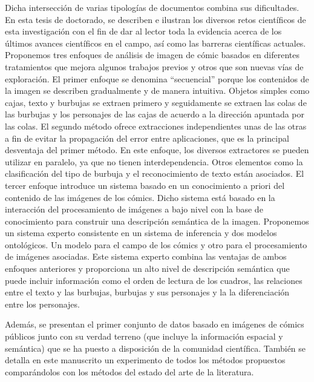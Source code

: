 Dicha intersección de varias tipologías de documentos combina sus dificultades.
En esta tesis de doctorado, se describen e ilustran los diversos retos científicos de esta investigación con el fin de dar al lector toda la evidencia acerca de los últimos avances científicos en el campo, así como las barreras científicas actuales.
Proponemos tres enfoques de análisis de imagen de cómic basados en diferentes tratamientos que mejora algunos trabajos previos y otros que son nuevas vías de exploración.
El primer enfoque se denomina ``secuencial'' porque los contenidos de la imagen se describen gradualmente y de manera intuitiva.
Objetos simples como cajas, texto y burbujas se extraen primero y seguidamente se extraen las colas de las burbujas y los personajes de las cajas de acuerdo a la dirección apuntada por las colas.
El segundo método ofrece extracciones independientes unas de las otras a fin de evitar la propagación del error entre aplicaciones, que es la principal desventaja del primer método.
En este enfoque, los diversos extractores se pueden utilizar en paralelo, ya que no tienen interdependencia.
Otros elementos como la clasificación del tipo de burbuja y el reconocimiento de texto están asociados.
El tercer enfoque introduce un sistema basado en un conocimiento a priori del contenido de las imágenes de los cómics. Dicho sistema está basado en la interacción del procesamiento de imágenes a bajo nivel con la base de conocimiento para construir una descripción semántica de la imagen.
Proponemos un sistema experto consistente en un sistema de inferencia y dos modelos ontológicos. Un modelo para el campo de los cómics y otro para el procesamiento de imágenes asociadas.
Este sistema experto combina las ventajas de ambos enfoques anteriores y proporciona un alto nivel de descripción semántica que puede incluir información como el orden de lectura de los cuadros, las relaciones entre el texto y las burbujas, burbujas y sus personajes y la la diferenciación entre los personajes.

Además, se presentan el primer conjunto de datos basado en imágenes de cómics públicos junto con su verdad terreno (que incluye la información espacial y semántica) que se ha puesto a disposición de la comunidad científica.
También se detalla en este manuscrito un experimento de todos los métodos propuestos comparándolos con los métodos del estado del arte de la literatura.

